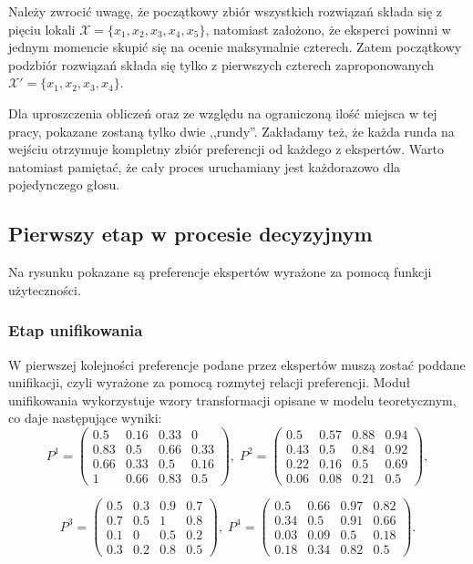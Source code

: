 Należy zwrocić uwagę, że początkowy zbiór wszystkich rozwiązań składa się z
pięciu lokali $\mathcal{X} = \{ x_1, x_2, x_3, x_4, x_5\}$, natomiast założono,
że eksperci powinni w jednym momencie skupić się na ocenie maksymalnie czterech.
Zatem początkowy podzbiór rozwiązań składa się tylko z pierwszych czterech
zaproponowanych $\mathcal{X'} = \{ x_1, x_2, x_3, x_4\}$.

Dla uproszczenia obliczeń oraz ze względu na ograniczoną ilość miejsca w tej
pracy, pokazane zostaną tylko dwie ,,rundy''. Zakładamy też, że każda runda na
wejściu otrzymuje kompletny zbiór preferencji od każdego z ekspertów. 
Warto natomiast pamiętać, że cały proces uruchamiany jest każdorazowo dla
pojedynczego głosu. 

\subsection{Pierwszy etap w procesie decyzyjnym}
Na rysunku pokazane są preferencje ekspertów wyrażone za pomocą funkcji
użyteczności.

\subsubsection{Etap unifikowania}
W pierwszej kolejności preferencje podane przez ekspertów muszą zostać poddane
unifikacji, czyli wyrażone za pomocą rozmytej relacji preferencji. Moduł
unifikowania wykorzystuje wzory transformacji opisane w modelu teoretycznym, co
daje następujące wyniki:
$$
P^1 = 
\begin{pmatrix}
0.5  & 0.16  & 0.33  & 0    \\
0.83 & 0.5   & 0.66  & 0.33 \\
0.66 & 0.33  & 0.5   & 0.16 \\
1    & 0.66  & 0.83  & 0.5
\end{pmatrix},\;
P^2 = 
\begin{pmatrix}
0.5  & 0.57  & 0.88  & 0.94 \\
0.43 & 0.5   & 0.84  & 0.92 \\
0.22 & 0.16  & 0.5   & 0.69 \\
0.06 & 0.08  & 0.21  & 0.5
\end{pmatrix},
$$

$$
P^3 = 
\begin{pmatrix}
0.5  & 0.3   & 0.9   & 0.7  \\
0.7  & 0.5   & 1     & 0.8  \\
0.1  & 0     & 0.5   & 0.2  \\
0.3  & 0.2   & 0.8   & 0.5
\end{pmatrix},\;
P^4 = 
\begin{pmatrix}
0.5  & 0.66  & 0.97  & 0.82 \\
0.34 & 0.5   & 0.91  & 0.66 \\
0.03 & 0.09  & 0.5   & 0.18 \\
0.18 & 0.34  & 0.82  & 0.5
\end{pmatrix}.
$$
  
